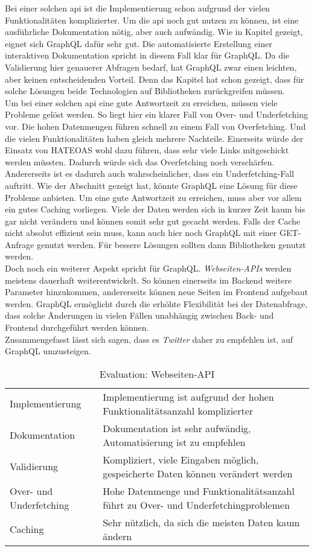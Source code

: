 Bei einer solchen \ac{api} ist die Implementierung schon aufgrund der vielen Funktionalitäten komplizierter. Um die \ac{api} noch gut nutzen zu können, ist eine ausführliche Dokumentation nötig, aber auch aufwändig. Wie in Kapitel  gezeigt, eignet sich GraphQL dafür sehr gut. Die automatisierte Erstellung einer interaktiven Dokumentation spricht in diesem Fall klar für GraphQL. Da die Validierung hier genauerer Abfragen bedarf, hat GraphQL zwar einen leichten, aber keinen entscheidenden Vorteil. Denn das Kapitel  hat schon gezeigt, dass für solche Lösungen beide Technologien auf Bibliotheken zurückgreifen müssen.\\
Um bei einer solchen \ac{api} eine gute Antwortzeit zu erreichen, müssen viele Probleme gelöst werden. So liegt hier ein klarer Fall von Over- und Underfetching vor. Die hohen Datenmengen führen schnell zu einem Fall von Overfetching. Und die vielen Funktionalitäten haben gleich mehrere Nachteile. Einerseits würde der Einsatz von \ac{HATEOAS} wohl dazu führen, dass sehr viele Links mitgeschickt werden müssten. Dadurch würde sich das Overfetching noch verschärfen. Andererseits ist es dadurch auch wahrscheinlicher, dass ein Underfetching-Fall auftritt. Wie der Abschnitt  gezeigt hat, könnte GraphQL eine Lösung für diese Probleme anbieten. Um eine gute Antwortzeit zu erreichen, muss aber vor allem ein gutes Caching vorliegen. Viele der Daten werden sich in kurzer Zeit kaum bis gar nicht verändern und können somit sehr gut gecacht werden. Falls der Cache nicht absolut effizient sein muss, kann auch hier noch GraphQL mit einer GET-Anfrage genutzt werden. Für bessere Lösungen sollten dann Bibliotheken genutzt werden.\\
Doch noch ein weiterer Aspekt spricht für GraphQL. \textit{Webseiten-APIs} werden meistens dauerhaft weiterentwickelt. So können einerseits im Backend weitere Parameter hinzukommen, andererseits können neue Seiten im Frontend aufgebaut werden. GraphQL ermöglicht durch die erhöhte Flexibilität bei der Datenabfrage, dass solche Änderungen in vielen Fällen unabhängig zwischen Back- und Frontend durchgeführt werden können.\\
Zusammengefasst lässt sich sagen, dass es \textit{Twitter} daher zu empfehlen ist, auf GraphQL umzusteigen.

\begin{table}[H]
\begin{tabular}{p{4cm} p{10cm}}
Implementierung & Implementierung ist aufgrund der hohen Funktionalitätsanzahl komplizierter \\
Dokumentation & Dokumentation ist sehr aufwändig, Automatisierung ist zu empfehlen \\
Validierung & Kompliziert, viele Eingaben möglich, gespeicherte Daten können verändert werden \\
Over- und Underfetching &  Hohe Datenmenge und Funktionalitätsanzahl führt zu Over- und Underfetchingproblemen \\
Caching & Sehr nützlich, da sich die meisten Daten kaum ändern
\end{tabular}
\caption{Evaluation: Webseiten-API}
\end{table}

